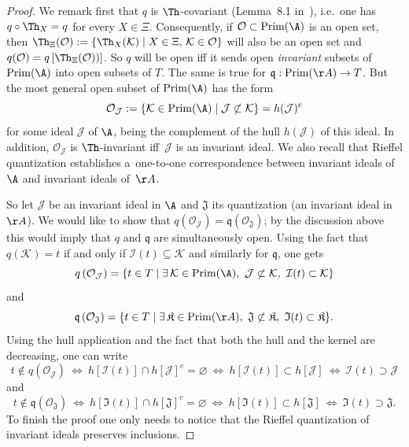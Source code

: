 \begin{proof}
We remark f\/irst that $q$ is $\Th$-covariant (Lemma~8.1 in~\cite{Wi}), i.e.\ one has $q\circ\Th_X=q$ for every $X\in\Xi$.
Consequently, if $\mathcal O\subset {\rm Prim}(\A)$ is
an open set, then $\Th_\Xi(\mathcal O):=\{\Th_X(\mathcal K)\mid X\in\Xi, \, \mathcal K\in\mathcal O\}$ will also be an open set
and $q(\mathcal O)=q\left[\Th_\Xi(\mathcal O)\right)]$.
So $q$ will be open if\/f it sends open {\it invariant} subsets of ${\rm Prim}(\A)$
into open subsets of $T$. The same is true for $\mathfrak q:{\rm Prim}(\AA)\rightarrow T$. But the most general
open subset of ${\rm Prim}(\A)$ has the form
\[
\mathcal O_{\mathcal J}:=\{\mathcal K\in {\rm Prim}(\A)\mid \mathcal J\not\subset\mathcal K\}=h(\mathcal J)^c
\]
for some ideal $\mathcal J$ of $\A$, being the complement of the hull  $h(\mathcal J)$ of this ideal.
In addition, $\mathcal O_{\mathcal J}$ is $\Th$-invariant if\/f~$\mathcal J$ is an
invariant ideal. We also recall that Rief\/fel quantization establishes
a~one-to-one correspondence between invariant ideals of $\A$ and invariant ideals of~$\AA$.

So let $\mathcal J$ be an invariant ideal in $\A$ and $\mathfrak J$ its quantization
(an invariant ideal in~$\AA$). We would like to show that
$q\left(\mathcal O_\mathcal J\right)=\mathfrak q\left(\mathcal O_\mathfrak J\right)$;
by the discussion above this would imply that $q$ and $\mathfrak q$ are simultaneously open. Using the fact that
$q(\mathcal K)=t$ if and only if $\mathcal I(t)\subseteq \mathcal K$ and similarly for $\mathfrak q$, one gets
\[
q\left(\mathcal O_\mathcal J\right)=\{t\in T\mid \exists\,\mathcal K\in {\rm Prim}(\A),\ \mathcal J\not\subset\mathcal K,
\ \mathcal I(t)\subset\mathcal K\}
\]
and
\[
\mathfrak q\left(\mathcal O_\mathfrak J\right)=\{t\in T\mid \exists\,\mathfrak K\in {\rm Prim}(\AA),\
\mathfrak J\not\subset\mathfrak K,\ \mathfrak I(t)\subset\mathfrak K\}.
\]
Using the hull application  and the fact that both the hull and the kernel are decreasing, one can write
\[
t\notin q\left(\mathcal O_\mathcal J\right)\ \Longleftrightarrow\ h[\mathcal I(t)]\cap h[\mathcal J]^c=\varnothing
\ \Longleftrightarrow\ h[\mathcal I(t)]\subset h[\mathcal J]\ \Longleftrightarrow\ \mathcal I(t)\supset\mathcal J
\]
and
\[
t\notin \mathfrak q\left(\mathcal O_\mathfrak J\right)\ \Longleftrightarrow\ h[\mathfrak I(t)]\cap h[\mathfrak J]^c=\varnothing
\ \Longleftrightarrow\ h[\mathfrak I(t)]\subset h[\mathfrak J]\ \Longleftrightarrow\ \mathfrak I(t)\supset\mathfrak J.
\]
To f\/inish the proof one only needs to notice that the Rief\/fel quantization of invariant ideals preserves inclusions.
\end{proof}
